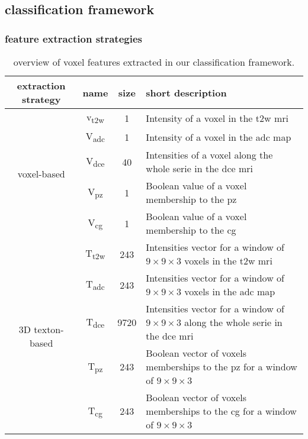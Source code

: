\subsection{classification framework}\label{subsec:classif}

\subsubsection{feature extraction strategies}\label{subsubsec:featextr}

\begin{table}[h]
\caption{overview of voxel features extracted in our classification framework.} 
\label{tab:feat}
\renewcommand{\arraystretch}{1.3}
\begin{center}       
\begin{tabular}{c|c|c|p{9cm}} %
\hline
extraction strategy & name & size & short description  \\
\hline
\hline
\multirow{5}{*}{voxel-based} & v\textsubscript{\ac{t2w}} & 1 & Intensity of a voxel in the \ac{t2w} \ac{mri} \\
 & V\textsubscript{\ac{adc}} & 1 & Intensity of a voxel in the \ac{adc} map  \\
 & V\textsubscript{\ac{dce}} & 40 & Intensities of a voxel along the whole serie in the \ac{dce} \ac{mri}  \\
 & V\textsubscript{\ac{pz}} & 1 & Boolean value of a voxel membership to the \ac{pz} \\
 & V\textsubscript{\ac{cg}} & 1 & Boolean value of a voxel membership to the \ac{cg} \\ 
\hline
\hline
\multirow{5}{*}{3D texton-based} & T\textsubscript{\ac{t2w}} & 243 & Intensities vector for a window of $9 \times 9 \times 3$ voxels in the \ac{t2w} \ac{mri} \\
 & T\textsubscript{\ac{adc}} & 243 & Intensities vector for a window of $9 \times 9 \times 3$ voxels in the \ac{adc} map \\
 & T\textsubscript{\ac{dce}} & 9720 & Intensities vector for a window of $9 \times 9 \times 3$ along the whole serie in the \ac{dce} \ac{mri} \\
 & T\textsubscript{\ac{pz}} & 243 & Boolean vector of voxels memberships to the \ac{pz} for a window of $9 \times 9 \times 3$ \\
 & T\textsubscript{\ac{cg}} & 243 & Boolean vector of voxels memberships to the \ac{cg} for a window of $9 \times 9 \times 3$ \\
\hline 
\end{tabular}
\end{center}
\end{table}

